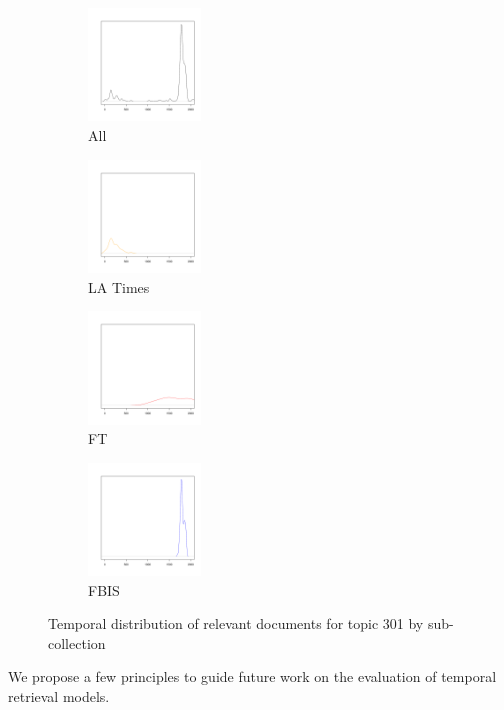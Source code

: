 \documentclass[runningheads,a4paper]{llncs}
\begin{document}
\begin{figure}
\begin{subfigure}[t]{1in}
\includegraphics[width=3cm]{analysis/301/301-trec8.pdf}
\caption{All}
\end{subfigure}
\begin{subfigure}[t]{1in}
\includegraphics[width=3cm]{analysis/301/301-la.pdf}
\caption{LA Times}
\end{subfigure}
\begin{subfigure}[t]{1in}
\includegraphics[width=3cm]{analysis/301/301-ft.pdf}
\caption{FT}
\end{subfigure}
\begin{subfigure}[t]{1in}
\includegraphics[width=3cm]{analysis/301/301-fbis.pdf}
\caption{FBIS}
\end{subfigure}
\caption{Temporal distribution of relevant documents for topic 301 by sub-collection} 
\label{fig.301}
\end{figure}



We propose a few principles to guide future work on the evaluation of temporal retrieval models.
\end{document}
